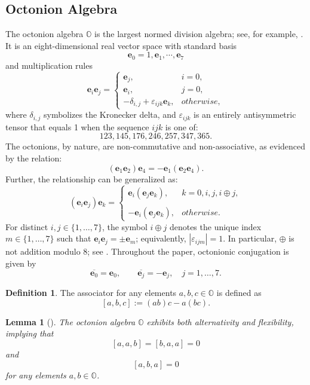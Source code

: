 \documentclass{amsart}
\newtheorem{lemma}[theorem]{Lemma}
\theoremstyle{definition}
\newtheorem{definition}[theorem]{Definition}
\theoremstyle{remark}
\numberwithin{equation}{section}
\newcommand{\OO}{\mathbb O}
\newcommand{\e}{\bm{e}}
\begin{document}
\subsection{Octonion Algebra}
The octonion algebra $\OO$ is the largest normed division algebra; see, for example, \cite{B2002}. It is an eight-dimensional real vector space with standard basis
  \[
\e_0=1,\e_1,\cdots,\e_7
\]
and multiplication rules
 \[
\e_i\e_j=\begin{cases}
    \e_j,\quad &i=0,\\
    \e_i,\quad &j=0,\\
    -\delta_{i,j} +\varepsilon_{ijk}\e_k, &otherwise,
 \end{cases}
\]
where $\delta_{i,j}$ symbolizes the Kronecker delta, and $\varepsilon_{ijk}$ is an entirely antisymmetric tensor that equals 1 when the sequence \(ijk\) is one of:
\[
123, 145, 176, 246, 257, 347, 365.
\]
The octonions, by nature, are non-commutative and non-associative, as evidenced by the relation:
  \[
(\e_1\e_2)\e_4=-\e_1(\e_2\e_4).
\]
  Further, the relationship can be generalized as:
   \begin{equation}
    \label{2023-09-13 18:46:08}
    (\e_i\e_j)\e_k=\begin{cases}
        \e_i(\e_j\e_k),& k=0,i,j,i\oplus j,\\\\
        -\e_i(\e_j\e_k),& otherwise.
     \end{cases}
 \end{equation}
For distinct $i,j\in\{1,\dots,7\}$, the symbol $i\oplus j$ denotes the unique index $m\in\{1,\dots,7\}$ such that $\e_i\e_j=\pm \e_m$; equivalently, $|\varepsilon_{ijm}|=1$. In particular, $\oplus$ is not addition modulo $8$; see \cite{RZhao}.
Throughout the paper, octonionic conjugation is given by
\[
\overline{\e_0}=\e_0,
\qquad
\overline{\e_j}=-\e_j,\quad j=1,\dots,7.
\]










 \begin{definition}
   The associator for any elements $a,b,c \in \OO$ is defined as
\[
[a,b,c]:=(ab)c-a(bc).
\]
 \end{definition}


 \begin{lemma}[\cite{S1954,B2002}]
   The octonion algebra $\OO$ exhibits both alternativity and flexibility, implying that
\[
[a,a,b]=[b,a,a]=0
\]
and
     \[
[a,b,a]=0
\]
for any elements $a,b \in \OO$.
 \end{lemma}
\end{document}
